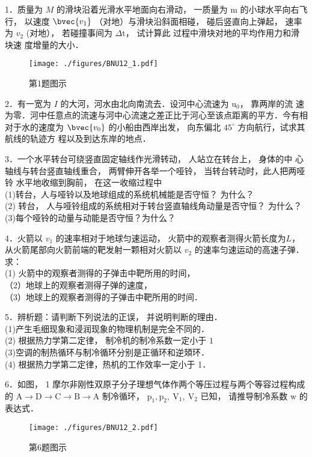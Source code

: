 
1．质量为 $M$ 的滑块沿着光滑水平地面向右滑动， 一质量为 $\mathrm{m}$ 的小球水平向右飞行， 以速度 $\bvec{v_1}$ （对地）与滑块沿斜面相碰， 碰后竖直向上弹起， 速率为
$v_2$ (对地）， 若碰撞事间为 $\Delta \mathrm{t}$， 试计算此 过程中滑块对地的平均作用力和滑块速
度增量的大小．
\begin{figure}[ht]
\centering
\texttt{[image: ./figures/BNU12\_1.pdf]}
\caption{第1题图示} \label{BNU12_fig1}
\end{figure}

2．有一宽为 $I$ 的大河，河水由北向南流去．设河中心流速为 $\mathrm{u}_{0}$， 靠两岸的流 速为零．河中任意点的流速与河中心流速之差正比于河心至该点距离的平方．今有相 对于水的速度为 $\bvec{v_0}$ 的小船由西岸出发， 向东偏北 $45^{\circ}$ 方向航行，试求其航线的轨迹方 程以及到达东岸的地点．

3．一个水平转台可绕竖直固定轴线作光滑转动， 人站立在转台上， 身体的中 心轴线与转台竖直轴线重合， 两臂伸开各举一个哑铃， 当转台转动时，此人把两哑铃 水平地收缩到胸前， 在这一收缩过程中\\
(1)转台，人与哑铃以及地球组成的系统机械能是否守恒？ 为什么？\\
(2) 转台， 人与哑铃组成的系统相对于转台竖直轴线角动量是否守恒？ 为什么？
(3)每个哑铃的动量与动能是否守恒？为什么？

4．火箭以 $v_1$ 的速率相对于地球匀速运动， 火箭中的观察者测得火箭长度为$L$，从火箭尾部向火箭前端的靶发射一颗相对火箭以 $v_{2}$ 的速率匀速运动的高速子弹． 求： \\(1) 火箭中的观察者测得的子弹击中靶所用的时间， \\（2）地球上的观察者测得子弹的速度， \\（3）地球上的观察者测得的子弹击中靶所用的时间．

5．辨析题：请判断下列说法的正误， 并说明判断的理由．\\
(1)产生毛细现象和浸润现象的物理机制是完全不同的．\\
(2) 根据热力学第二定律， 制冷机的制冷系数一定小于 $1$\\
(3)空调的制热循环与制冷循环分别是正循环和逆頍环．\\
(4) 根据热力学第二定律，热机的工作效率一定小于 1．

6．如图， 1 摩尔非刚性双原子分子理想气体作两个等压过程与两个等容过程构成的 $\mathrm{A} \rightarrow \mathrm{D} \rightarrow \mathrm{C} \rightarrow \mathrm{B} \rightarrow \mathrm{A}$
制冷循环， $\mathrm{p}_{1}, \mathrm{p}_{2}, \mathrm{~V}_{1}, \mathrm{~V}_{2}$ 已知， 请推导制冷系数 $\mathrm{w}$ 的表达式．
\begin{figure}[ht]
\centering
\texttt{[image: ./figures/BNU12\_2.pdf]}
\caption{第6题图示} \label{BNU12_fig2}
\end{figure}

